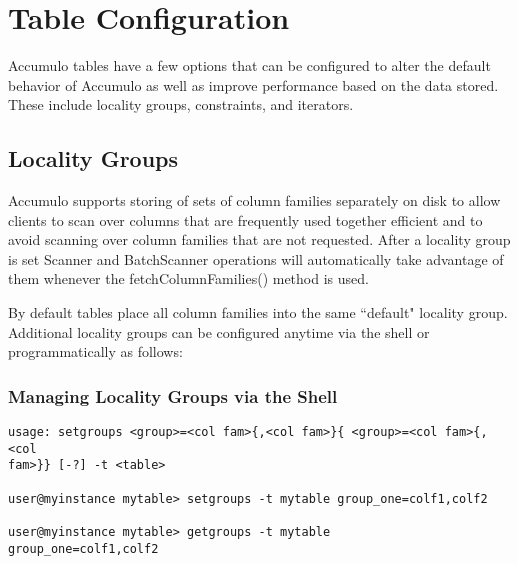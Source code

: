 
%
%

\chapter{Table Configuration}

Accumulo tables have a few options that can be configured to alter the default
behavior of Accumulo as well as improve performance based on the data stored.
These include locality groups, constraints, and iterators.

\section{Locality Groups}
Accumulo supports storing of sets of column families separately on disk to allow
clients to scan over columns that are frequently used together efficient and to avoid
scanning over column families that are not requested. After a locality group is set
Scanner and BatchScanner operations will automatically take advantage of them
whenever the fetchColumnFamilies() method is used.

By default tables place all column families into the same ``default" locality group.
Additional locality groups can be configured anytime via the shell or
programmatically as follows:

\subsection{Managing Locality Groups via the Shell}

\small
\begin{verbatim}
usage: setgroups <group>=<col fam>{,<col fam>}{ <group>=<col fam>{,<col
fam>}} [-?] -t <table>

user@myinstance mytable> setgroups -t mytable group_one=colf1,colf2

user@myinstance mytable> getgroups -t mytable
group_one=colf1,colf2
\end{verbatim}
\normalsize

